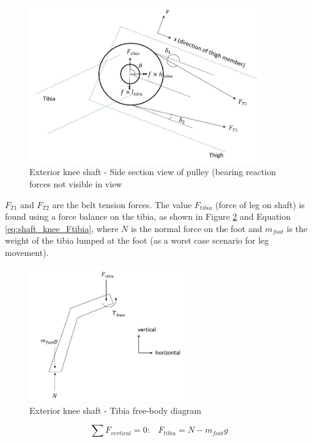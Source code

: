 \begin{figure}
    \centering
    \includegraphics[width=0.9\textwidth]{4_Analysis/img/Shafts/ShaftKneeSide.JPG}
    \caption{Exterior knee shaft - Side section view of pulley (bearing reaction forces not visible in view}
    \label{fig:shaft_knee_side}
\end{figure}

$F_{T1}$ and $F_{T2}$ are the belt tension forces. The value $F_{tibia}$ (force of leg on shaft) is found using a force balance on the tibia, as shown in Figure \ref{fig:shaft_knee_tibia} and Equation \ref{eq:shaft_knee_Ftibia}, where $N$ is the normal force on the foot and $m_{foot}$ is the weight of the tibia lumped at the foot (as a worst case scenario for leg movement).

\begin{figure}
    \centering
    \includegraphics[width=0.6\textwidth]{4_Analysis/img/Shafts/ShaftKneeTibia.JPG}
    \caption{Exterior knee shaft - Tibia free-body diagram}
    \label{fig:shaft_knee_tibia}
\end{figure}

\begin{equation}
    \sum F_{vertical}=0:\;\;\;F_{tibia}=N-m_{foot} g
    \label{eq:shaft_knee_Ftibia}
\end{equation}

